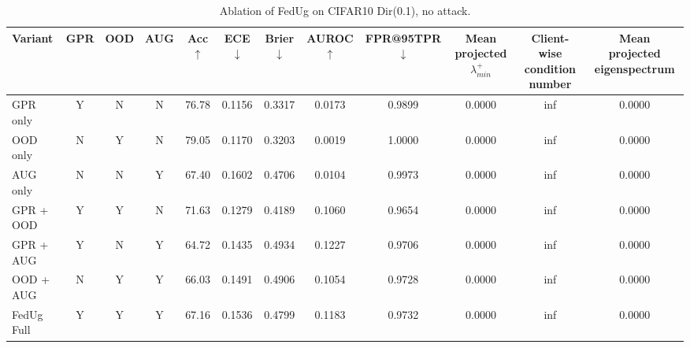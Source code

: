 \begin{table}[t]
\centering
\footnotesize
\caption{Ablation of FedUg on CIFAR10 Dir(0.1), no attack.}
\label{tab:ablation_main}
\begin{tabular}{@{}lccc|ccccc|ccc@{}}
\toprule
Variant & GPR & OOD & AUG & Acc$\uparrow$ & ECE$\downarrow$ & Brier$\downarrow$ & AUROC$\uparrow$ & FPR@95TPR$\downarrow$ & Mean projected $\lambda_{min}^{+}$ & Client-wise condition number & Mean projected eigenspectrum \\
\midrule
GPR only & Y & N & N & 76.78 & 0.1156 & 0.3317 & 0.0173 & 0.9899 & 0.0000 & inf & 0.0000 \\
OOD only & N & Y & N & 79.05 & 0.1170 & 0.3203 & 0.0019 & 1.0000 & 0.0000 & inf & 0.0000 \\
AUG only & N & N & Y & 67.40 & 0.1602 & 0.4706 & 0.0104 & 0.9973 & 0.0000 & inf & 0.0000 \\
GPR + OOD & Y & Y & N & 71.63 & 0.1279 & 0.4189 & 0.1060 & 0.9654 & 0.0000 & inf & 0.0000 \\
GPR + AUG & Y & N & Y & 64.72 & 0.1435 & 0.4934 & 0.1227 & 0.9706 & 0.0000 & inf & 0.0000 \\
OOD + AUG & N & Y & Y & 66.03 & 0.1491 & 0.4906 & 0.1054 & 0.9728 & 0.0000 & inf & 0.0000 \\
FedUg Full & Y & Y & Y & 67.16 & 0.1536 & 0.4799 & 0.1183 & 0.9732 & 0.0000 & inf & 0.0000 \\
\bottomrule
\end{tabular}
\end{table}
